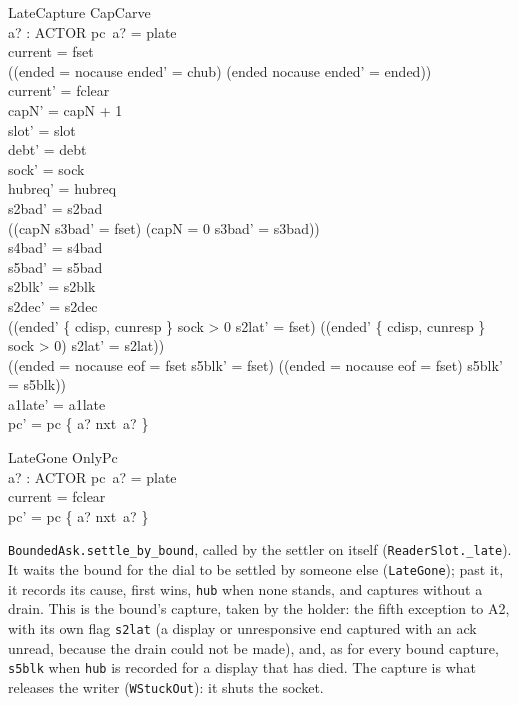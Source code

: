 \documentclass[a4paper,10pt,fleqn]{article}
\begin{document}
\begin{schema}{LateCapture}
  CapCarve \\
  a? : ACTOR
\where
  pc~a? = plate \\
  current = fset \\
  ((ended = nocause \land ended' = chub) \lor (ended \neq nocause \land ended' = ended)) \\
  current' = fclear \\
  capN' = capN + 1 \\
  slot' = slot \\
  debt' = debt \\
  sock' = sock \\
  hubreq' = hubreq \\
  s2bad' = s2bad \\
  ((capN  \land s3bad' = fset) \lor (capN = 0 \land s3bad' = s3bad)) \\
  s4bad' = s4bad \\
  s5bad' = s5bad \\
  s2blk' = s2blk \\
  s2dec' = s2dec \\
  ((ended' \in \{ cdisp, cunresp \} \land sock > 0 \land s2lat' = fset) \lor
    (\lnot (ended' \in \{ cdisp, cunresp \} \land sock > 0) \land s2lat' = s2lat)) \\
  ((ended = nocause \land eof = fset \land s5blk' = fset) \lor
    (\lnot (ended = nocause \land eof = fset) \land s5blk' = s5blk)) \\
  a1late' = a1late \\
  pc' = pc \oplus \{ a? \mapsto nxt~a? \}
\end{schema}

\begin{schema}{LateGone}
  OnlyPc \\
  a? : ACTOR
\where
  pc~a? = plate \\
  current = fclear \\
  pc' = pc \oplus \{ a? \mapsto nxt~a? \}
\end{schema}

\texttt{BoundedAsk.settle\_by\_bound}, called by the settler on itself
(\texttt{ReaderSlot.\_late}).  It waits the bound for the dial to be settled by
someone else (\texttt{LateGone}); past it, it records its cause, first wins,
\texttt{hub} when none stands, and captures without a drain.  This is the
bound's capture, taken by the holder: the fifth exception to A2, with its own
flag \texttt{s2lat} (a display or unresponsive end captured with an ack unread,
because the drain could not be made), and, as for every bound capture,
\texttt{s5blk} when \texttt{hub} is recorded for a display that has died.  The
capture is what releases the writer (\texttt{WStuckOut}): it shuts the socket.
\end{document}
